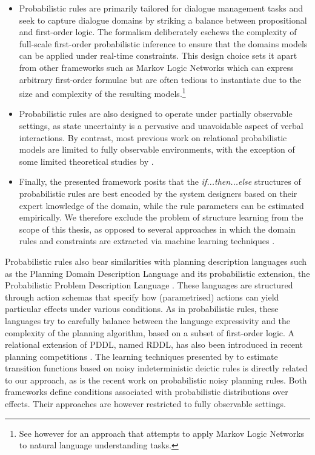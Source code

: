 \begin{itemize}

\item Probabilistic rules are primarily tailored for dialogue management tasks and seek to capture dialogue domains by striking a balance between propositional and first-order logic. The formalism deliberately eschews the complexity of full-scale first-order probabilistic inference to ensure that the domains models can be applied under real-time constraints. This design choice sets it apart from other frameworks such as Markov Logic Networks which can express arbitrary first-order formulae but are often tedious to instantiate due to the size and complexity of the resulting models.\footnote{See however \cite{Kennington:2012} for an approach that attempts to apply Markov Logic Networks to natural language understanding tasks.} 

\item Probabilistic rules are also designed to operate under partially observable settings, as state uncertainty is a pervasive and unavoidable aspect of verbal interactions.  By contrast, most previous work on relational probabilistic models are limited to fully observable environments, with the exception of some limited theoretical studies by \cite{Wang:2010,SannerK10}. 

\item Finally, the presented framework posits that the \textit{if...then...else} structures of probabilistic rules are best encoded by the system designers based on their expert knowledge of the domain, while the rule parameters can be estimated empirically. We therefore exclude the problem of structure learning from the scope of this thesis, as opposed to several approaches in which the domain rules and constraints are extracted via machine learning techniques \citep{PasulaZK07,Kok:2009}.

\end{itemize}

Probabilistic rules also bear similarities with planning description languages such as the Planning Domain Description Language \citep[PDDL, see ][]{mcdermott1998} and its probabilistic extension, the Probabilistic Problem Description Language \citep[PPDDL, see ][]{younes2004ppddl1}.  These languages are structured through action schemas that specify how (parametrised) actions can yield particular effects under various conditions. As in probabilistic rules, these languages try to carefully balance between the language expressivity and the complexity of the planning algorithm, based on a subset of first-order logic. A relational extension of PDDL, named RDDL, has also been introduced in recent planning competitions \citep{Sanner:RDDL}. The learning techniques presented by \cite{PasulaZK07} to estimate transition functions based on noisy indeterministic deictic rules is directly related to our approach, as is the recent work \cite{lang10jair} on probabilistic noisy planning rules.   Both frameworks define conditions associated with probabilistic distributions over effects. Their approaches are however restricted to fully observable settings. 

